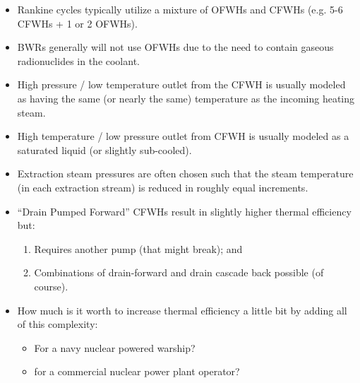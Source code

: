 \begin{itemize}
\item Rankine cycles typically utilize a mixture of OFWHs and CFWHs (e.g. 5-6 CFWHs + 1 or 2 OFWHs).  
\item BWRs generally will not use OFWHs due to the need to contain gaseous radionuclides in the coolant.  
\item High pressure / low temperature outlet from the CFWH is usually modeled as having the same (or nearly the same) temperature as the incoming heating steam.  
\item High temperature / low pressure outlet from CFWH is usually modeled as a saturated liquid (or slightly sub-cooled).
\item Extraction steam pressures are often chosen such that the steam temperature (in each extraction stream) is reduced in roughly equal increments.
\item ``Drain Pumped Forward'' CFWHs result in slightly higher thermal efficiency but:
\begin{enumerate}
\item Requires another pump (that might break); and
\item Combinations of drain-forward and drain cascade back possible (of course).
\end{enumerate}
\item How much is it worth to increase thermal efficiency a little bit by adding all of this complexity:
\begin{itemize}
\item For a navy nuclear powered warship?
\item for a commercial nuclear power plant operator?
\end{itemize}
\end{itemize} 

